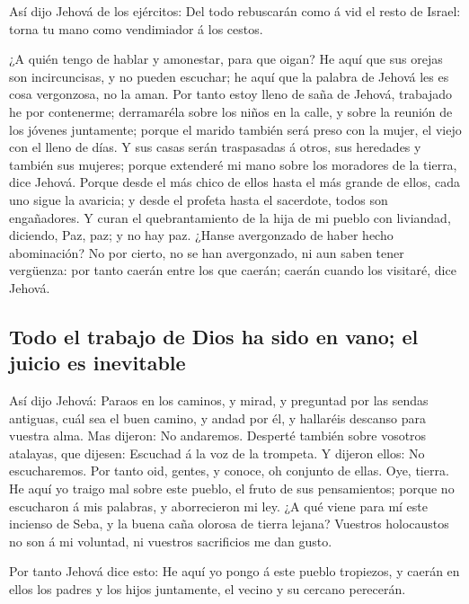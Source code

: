  Así dijo Jehová de los ejércitos: Del todo rebuscarán como
á vid el resto de Israel: torna tu mano como vendimiador á los cestos.

 ¿A quién tengo de hablar y amonestar, para que oigan? He
aquí que sus orejas son incircuncisas, y no pueden escuchar; he aquí que
la palabra de Jehová les es cosa vergonzosa, no la aman. 
Por tanto estoy lleno de saña de Jehová, trabajado he por contenerme;
derramaréla sobre los niños en la calle, y sobre la reunión de los
jóvenes juntamente; porque el marido también será preso con la mujer, el
viejo con el lleno de días.  Y sus casas serán traspasadas
á otros, sus heredades y también sus mujeres; porque extenderé mi mano
sobre los moradores de la tierra, dice Jehová.  Porque
desde el más chico de ellos hasta el más grande de ellos, cada uno sigue
la avaricia; y desde el profeta hasta el sacerdote, todos son
engañadores.  Y curan el quebrantamiento de la hija de mi
pueblo con liviandad, diciendo, Paz, paz; y no hay paz. 
¿Hanse avergonzado de haber hecho abominación? No por cierto, no se han
avergonzado, ni aun saben tener vergüenza: por tanto caerán entre los
que caerán; caerán cuando los visitaré, dice Jehová.

\hypertarget{todo-el-trabajo-de-dios-ha-sido-en-vano-el-juicio-es-inevitable}{%
\subsection{Todo el trabajo de Dios ha sido en vano; el juicio es
inevitable}\label{todo-el-trabajo-de-dios-ha-sido-en-vano-el-juicio-es-inevitable}}

 Así dijo Jehová: Paraos en los caminos, y mirad, y
preguntad por las sendas antiguas, cuál sea el buen camino, y andad por
él, y hallaréis descanso para vuestra alma. Mas dijeron: No andaremos.
 Desperté también sobre vosotros atalayas, que dijesen:
Escuchad á la voz de la trompeta. Y dijeron ellos: No escucharemos.
 Por tanto oid, gentes, y conoce, oh conjunto de ellas.
 Oye, tierra. He aquí yo traigo mal sobre este pueblo, el
fruto de sus pensamientos; porque no escucharon á mis palabras, y
aborrecieron mi ley.  ¿A qué viene para mí este incienso de
Seba, y la buena caña olorosa de tierra lejana? Vuestros holocaustos no
son á mi voluntad, ni vuestros sacrificios me dan gusto.

 Por tanto Jehová dice esto: He aquí yo pongo á este pueblo
tropiezos, y caerán en ellos los padres y los hijos juntamente, el
vecino y su cercano perecerán.

